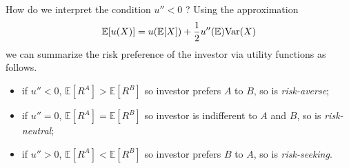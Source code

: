 How do we interpret the condition $u''<0$ ? Using the approximation
\begin{equation*}
  \mathbb{E}[u(X)] = u (\mathbb{E}[X]) + \frac{1}{2}u''(\mathbb{E})\text{Var}(X)
\end{equation*}
we can summarize the risk preference of the investor via utility functions as follows.
\begin{itemize}
\item if $u'' < 0$, $\mathbb{E}[R^A] > \mathbb{E}[R^B]$ so investor prefers $A$ to $B$, so is \emph{risk-averse};
\item if $u'' = 0$, $\mathbb{E}[R^A] = \mathbb{E}[R^B]$ so investor is indifferent to $A$ and $B$, so is \emph{risk-neutral};
\item if $u'' > 0$, $\mathbb{E}[R^A] < \mathbb{E}[R^B]$ so investor prefers $B$ to $A$, so is \emph{risk-seeking}.
\end{itemize}

%
%
%
%
%
%
%
%
%
%
%
%
%
%
%
%
%
%
%
%
%
%

